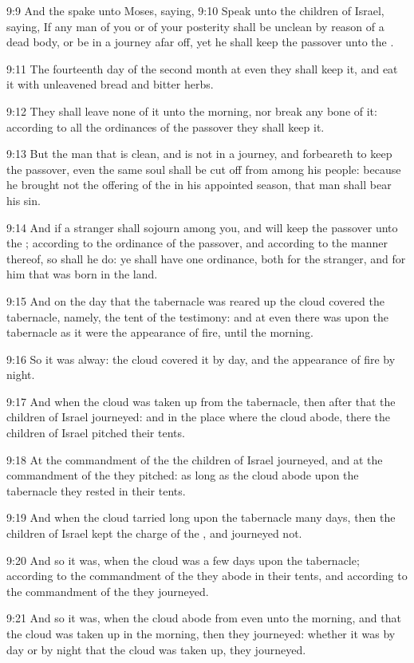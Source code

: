 9:9 And the \LORD spake unto Moses, saying, 9:10 Speak unto the
children of Israel, saying, If any man of you or of your posterity
shall be unclean by reason of a dead body, or be in a journey afar
off, yet he shall keep the passover unto the \LORD.

9:11 The fourteenth day of the second month at even they shall keep
it, and eat it with unleavened bread and bitter herbs.

9:12 They shall leave none of it unto the morning, nor break any bone
of it: according to all the ordinances of the passover they shall keep
it.

9:13 But the man that is clean, and is not in a journey, and
forbeareth to keep the passover, even the same soul shall be cut off
from among his people: because he brought not the offering of the \LORD
in his appointed season, that man shall bear his sin.

9:14 And if a stranger shall sojourn among you, and will keep the
passover unto the \LORD; according to the ordinance of the passover,
and according to the manner thereof, so shall he do: ye shall have one
ordinance, both for the stranger, and for him that was born in the
land.

9:15 And on the day that the tabernacle was reared up the cloud
covered the tabernacle, namely, the tent of the testimony: and at even
there was upon the tabernacle as it were the appearance of fire, until
the morning.

9:16 So it was alway: the cloud covered it by day, and the appearance
of fire by night.

9:17 And when the cloud was taken up from the tabernacle, then after
that the children of Israel journeyed: and in the place where the
cloud abode, there the children of Israel pitched their tents.

9:18 At the commandment of the \LORD the children of Israel journeyed,
and at the commandment of the \LORD they pitched: as long as the cloud
abode upon the tabernacle they rested in their tents.

9:19 And when the cloud tarried long upon the tabernacle many days,
then the children of Israel kept the charge of the \LORD, and journeyed
not.

9:20 And so it was, when the cloud was a few days upon the tabernacle;
according to the commandment of the \LORD they abode in their tents,
and according to the commandment of the \LORD they journeyed.

9:21 And so it was, when the cloud abode from even unto the morning,
and that the cloud was taken up in the morning, then they journeyed:
whether it was by day or by night that the cloud was taken up, they
journeyed.

